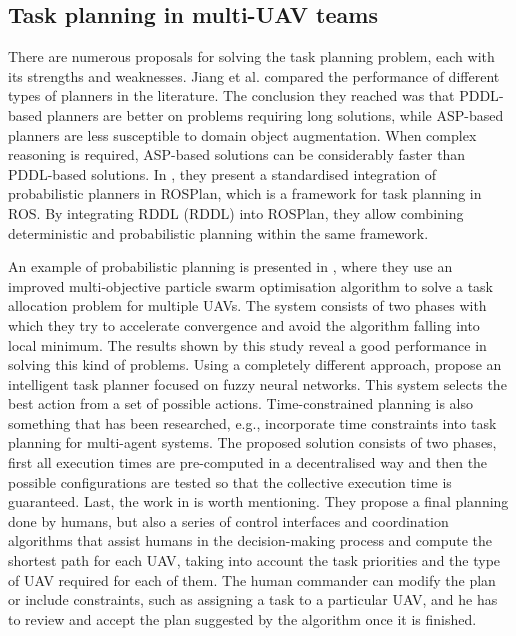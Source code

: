 \subsection{Task planning in multi-\gls{UAV} teams}
\label{subsec:TaskPlanning}
There are numerous proposals for solving the task planning problem, each with its strengths and weaknesses. Jiang et al. \cite{jiang2019task} compared the performance of different types of planners in the literature. The conclusion they reached was that \gls{PDDL}-based planners are better on problems requiring long solutions, while \gls{ASP}-based planners are less susceptible to domain object augmentation. When complex reasoning is required, \gls{ASP}-based solutions can be considerably faster than \gls{PDDL}-based solutions. In \cite{canal2019probabilistic}, they present a standardised integration of probabilistic planners in ROSPlan, which is a framework for task planning in \gls{ROS}. By integrating \acrshort{RDDL} (\acrlong{RDDL}) into ROSPlan, they allow combining deterministic and probabilistic planning within the same framework.

An example of probabilistic planning is presented in \cite{gao2018multi}, where they use an improved multi-objective particle swarm optimisation algorithm to solve a task allocation problem for multiple \glspl{UAV}. The system consists of two phases with which they try to accelerate convergence and avoid the algorithm falling into local minimum. The results shown by this study reveal a good performance in solving this kind of problems. Using a completely different approach, \cite{jolly2010intelligent} propose an intelligent task planner focused on fuzzy neural networks. This system selects the best action from a set of possible actions. Time-constrained planning is also something that has been researched, e.g., \cite{nikou2016cooperative} incorporate time constraints into task planning for multi-agent systems. The proposed solution consists of two phases, first all execution times are pre-computed in a decentralised way and then the possible configurations are tested so that the collective execution time is guaranteed. Last, the work in  \cite{ramchurn2015study} is worth mentioning. They propose a final planning done by humans, but also a series of control interfaces and coordination algorithms that assist humans in the decision-making process and compute the shortest path for each \gls{UAV}, taking into account the task priorities and the type of \gls{UAV} required for each of them. The human commander can modify the plan or include constraints, such as assigning a task to a particular \gls{UAV}, and he has to  review and accept the plan suggested by the algorithm once it is finished.

